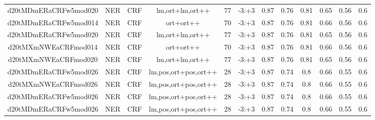 \documentclass[a4paper]{article}
\begin{document}
\begin{landscape}
\begin{center}
\begin{tabular}{ |c|c|c|c|c|c|c|c|c|c|c|c|}
 	
 
 	
 		
 		\small{ d20tMDmERaCRFw5mod020 } & NER & CRF & lm,ort+lm,ort++  &  77 &  -3:+3  &  0.87 & 0.76 & 0.81  &  0.65 & 0.56 & 0.6 \\
 		

 	
 
 	
 		
 		\small{ d20tMDmERaCRFw5mod014 } & NER & CRF & ort+ort++  &  70 &  -3:+3  &  0.87 & 0.76 & 0.81  &  0.66 & 0.56 & 0.6 \\
 		

 	
 
 	
 		
 		\small{ d20tMDmERaCRFw5mod020 } & NER & CRF & lm,ort+lm,ort++  &  77 &  -3:+3  &  0.87 & 0.76 & 0.81  &  0.65 & 0.56 & 0.6 \\
 		

 	
 
 	
 		
 		\small{ d20tMXmNWEaCRFmod014 } & NER & CRF & ort+ort++  &  70 &  -3:+3  &  0.87 & 0.76 & 0.81  &  0.66 & 0.56 & 0.6 \\
 		

 	
 
 	
 		
 		\small{ d20tMXmNWEaCRFmod020 } & NER & CRF & lm,ort+lm,ort++  &  77 &  -3:+3  &  0.87 & 0.76 & 0.81  &  0.65 & 0.56 & 0.6 \\
 		

 	
 
 	
 		
 		\small{ d20tMDmERaCRFw5mod026 } & NER & CRF & lm,pos,ort+pos,ort++  &  28 &  -3:+3  &  0.87 & 0.74 & 0.8  &  0.66 & 0.55 & 0.6 \\
 		

 	
 
 	
 		
 		\small{ d20tMXmNWEaCRFmod026 } & NER & CRF & lm,pos,ort+pos,ort++  &  28 &  -3:+3  &  0.87 & 0.74 & 0.8  &  0.66 & 0.55 & 0.6 \\
 		

 	
 
 	
 		
 		\small{ d20tMDmERaCRFw5mod026 } & NER & CRF & lm,pos,ort+pos,ort++  &  28 &  -3:+3  &  0.87 & 0.74 & 0.8  &  0.66 & 0.55 & 0.6 \\
 		

 	
 
 	
 		
 		\small{ d20tMDmERaCRFw5mod026 } & NER & CRF & lm,pos,ort+pos,ort++  &  28 &  -3:+3  &  0.87 & 0.74 & 0.8  &  0.66 & 0.55 & 0.6 \\
 		


\end{tabular}
\end{center}
\end{landscape}
\end{document}
